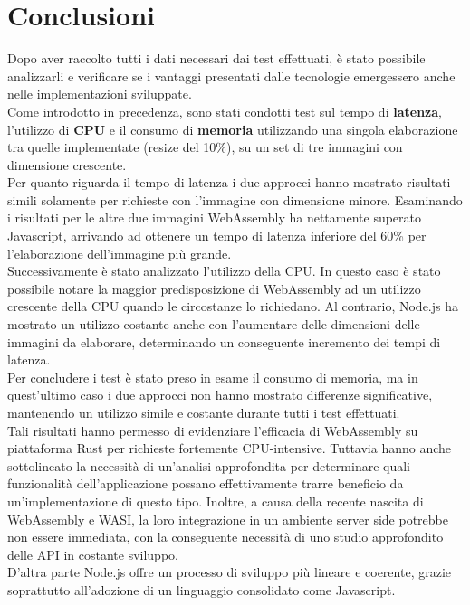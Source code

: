 \chapter*{Conclusioni}
\label{Conclusioni}
Dopo aver raccolto tutti i dati necessari dai test effettuati, è stato possibile analizzarli e verificare se i vantaggi presentati dalle tecnologie emergessero anche nelle implementazioni sviluppate.
\\Come introdotto in precedenza, sono stati condotti test sul tempo di \textbf{latenza}, l'utilizzo di \textbf{CPU} e il consumo di \textbf{memoria} utilizzando una singola elaborazione tra quelle implementate (resize del 10\%), su un set di tre immagini con dimensione crescente.
\\Per quanto riguarda il tempo di latenza i due approcci hanno mostrato risultati simili solamente per richieste con l'immagine con dimensione minore. Esaminando i risultati per le altre due immagini WebAssembly ha nettamente superato Javascript, arrivando ad ottenere un tempo di latenza inferiore del 60\% per l'elaborazione dell'immagine più grande.
\\Successivamente è stato analizzato l'utilizzo della CPU. In questo caso è stato possibile notare la maggior predisposizione di WebAssembly ad un utilizzo crescente della CPU quando le circostanze lo richiedano.
Al contrario, Node.js ha mostrato un utilizzo costante anche con l'aumentare delle dimensioni delle immagini da elaborare, determinando un conseguente incremento dei tempi di latenza.
\\Per concludere i test è stato preso in esame il consumo di memoria, ma in quest'ultimo caso i due approcci non hanno mostrato differenze significative, mantenendo un utilizzo simile e costante durante tutti i test effettuati.
\\Tali risultati hanno permesso di evidenziare l'efficacia di WebAssembly su piattaforma Rust per richieste fortemente CPU-intensive.
Tuttavia hanno anche sottolineato la necessità di un'analisi approfondita per determinare quali funzionalità dell’applicazione possano effettivamente trarre beneficio da un’implementazione di questo tipo.
Inoltre, a causa della recente nascita di WebAssembly e WASI, la loro integrazione in un ambiente server side potrebbe non essere immediata, con la conseguente necessità di uno studio approfondito delle API in costante sviluppo.
\\D'altra parte Node.js offre un processo di sviluppo più lineare e coerente, grazie soprattutto all'adozione di un linguaggio consolidato come Javascript.
